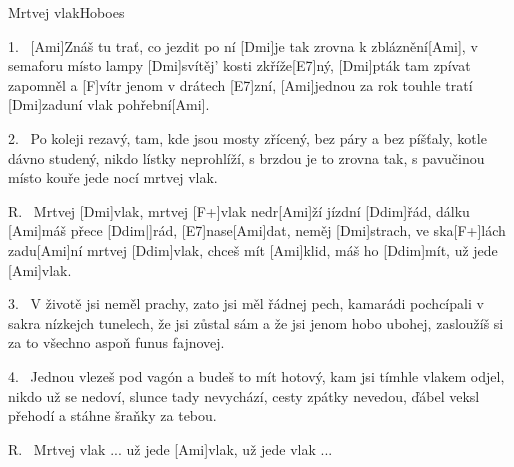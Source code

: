 \begin{song}{Mrtvej vlak}{Hoboes}

\begin{xverse}{1.~}
[Ami]Znáš tu trať, co jezdit po ní [Dmi]je tak zrovna k zbláznění[Ami],
v semaforu místo lampy [Dmi]svítěj' kosti zkříže[E7]ný,
[Dmi]pták tam zpívat zapomněl a [F]vítr jenom v drátech [E7]zní,
[Ami]jednou za rok touhle tratí [Dmi]zaduní vlak pohřební[Ami].
\end{xverse}

\begin{xverse}{2.~}
Po koleji rezavý, tam, kde jsou mosty zřícený,
bez páry a bez píšťaly, kotle dávno studený,
nikdo lístky neprohlíží, s brzdou je to zrovna tak,
s pavučinou místo kouře jede nocí mrtvej vlak.
\end{xverse}

\begin{xverse}{R.~}
Mrtvej [Dmi]vlak, mrtvej [F+]vlak nedr[Ami]{}ží jízdní [Ddim]{}řád,
dálku [Ami]máš přece [Ddim|]{rád,} [E7]nase[Ami]dat,
neměj [Dmi]strach, ve ska[F+]lách zadu[Ami]ní mrtvej [Ddim]vlak,
chceš mít [Ami]klid, máš ho [Ddim]mít, už jede [Ami]vlak.
\end{xverse}

\begin{xverse}{3.~}
V životě jsi neměl prachy, zato jsi měl řádnej pech,
kamarádi pochcípali v sakra nízkejch tunelech,
že jsi zůstal sám a že jsi jenom hobo ubohej,
zasloužíš si za to všechno aspoň funus fajnovej.
\end{xverse}

\begin{xverse}{4.~}
Jednou vlezeš pod vagón a budeš to mít hotový,
kam jsi tímhle vlakem odjel, nikdo už se nedoví,
slunce tady nevychází, cesty zpátky nevedou,
ďábel veksl přehodí a stáhne šraňky za tebou.
\end{xverse}

\begin{xverse}{R.~}
Mrtvej vlak ...
už jede [Ami]vlak, už jede vlak ...
\end{xverse}

\end{song}


